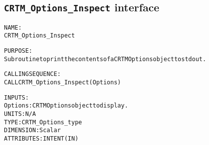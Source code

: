 \subsection{\texttt{CRTM\_Options\_Inspect} interface}
  \label{sec:CRTM_Options_Inspect_interface}
  \begin{alltt}
 
  NAME:
        CRTM_Options_Inspect
 
  PURPOSE:
        Subroutine to print the contents of a CRTM Options object to stdout.
 
  CALLING SEQUENCE:
        CALL CRTM_Options_Inspect( Options )
 
  INPUTS:
        Options:       CRTM Options object to display.
                       UNITS:      N/A
                       TYPE:       CRTM_Options_type
                       DIMENSION:  Scalar
                       ATTRIBUTES: INTENT(IN)
 
  \end{alltt}
